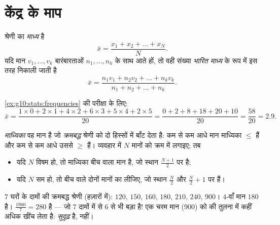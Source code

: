 \section{केंद्र के माप}

\begin{definition}[माध्य]\label{def:g10:stats:mean}
श्रेणी का \emph{माध्य} है
\[
\bar x = \frac{x_1 + x_2 + \dots + x_N}{N}.
\]
यदि मान $v_1, \dots, v_k$ बारंबारताओं $n_1, \dots, n_k$ के साथ आते हों, तो वही संख्या \emph{भारित
माध्य} के रूप में इस तरह निकाली जाती है
\[
\bar x = \frac{n_1 v_1 + n_2 v_2 + \dots + n_k v_k}{n_1 + n_2 + \dots + n_k}.
\]
\end{definition}

\begin{example}\label{ex:g10:stats:mean}
\cref{ex:g10:stats:frequencies} की परीक्षा के लिए:
\[
\bar x = \frac{1 \times 0 + 2 \times 1 + 4 \times 2 + 6 \times 3
+ 5 \times 4 + 2 \times 5}{20}
= \frac{0 + 2 + 8 + 18 + 20 + 10}{20}
= \frac{58}{20} = 2.9 .
\]
\end{example}

\begin{definition}[माध्यिका]\label{def:g10:stats:median}
\emph{माध्यिका} वह मान है जो \emph{क्रमबद्ध} श्रेणी को दो
हिस्सों में बाँट देता है: कम से कम आधे मान माध्यिका $\leq$ हैं और कम से कम
आधे उससे $\geq$ हैं। व्यवहार में $N$ मानों को क्रम में लगाइए; तब
\begin{itemize}
  \item यदि $N$ विषम हो, तो माध्यिका बीच वाला मान है, जो स्थान $\frac{N+1}{2}$ पर है;
  \item यदि $N$ सम हो, तो बीच वाले दोनों मानों का  लीजिए, जो
        स्थान $\frac N2$ और $\frac N2 + 1$ पर हैं।
\end{itemize}
\end{definition}

\begin{example}\label{ex:g10:stats:median}
$7$ घरों के दामों की क्रमबद्ध श्रेणी (हज़ारों में): $120$, $150$, $160$,
$180$, $210$, $240$, $900$।  $4$-वाँ मान $180$ है।  $\frac{1960}{7} = 280$ है ---
जो $7$ दामों में से $6$ से भी बड़ा है! एक चरम मान ($900$)  को
 की तुलना में कहीं अधिक खींच लेता है:  \emph{सुदृढ़} है,
 नहीं।
\end{example}

